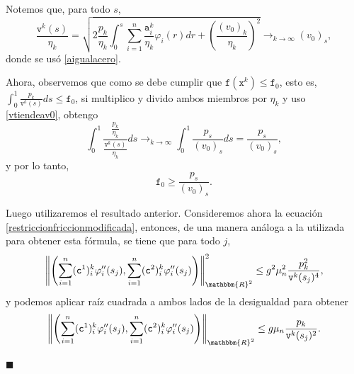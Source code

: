\documentclass[a4paper,10pt]{book}
\newcommand{\R}{\mathbbm{R}}
\newenvironment{dem}{\vspace*{-0.1cm}{\it Demostraci\'on:}}{\hfill
$\blacksquare$\\}
\begin{document}
\begin{dem}
Notemos que, para todo $s$,
\begin{equation}\label{vtiendeav0}
   \frac{\texttt{v}^k(s)}{\eta_k}=\sqrt{2\frac{p_k}{\eta_k}\int_0^s \sum_{i=1}^n\frac{\texttt{a}^k_i}{\eta_k}\varphi_i(r)dr +\left(\frac{(v_0)_k}{\eta_k}\right)^2} \mathop{\longrightarrow}_{k\to\infty}(v_0)_s, 
\end{equation}
donde se usó \eqref{aigualacero}.




Ahora, observemos que como se debe cumplir que $\texttt{f}(\texttt{x}^k)\leq \texttt{f}_0$, esto es, $\int_0^1\frac{p_k}{\texttt{v}^k(s)}ds\leq\texttt{f}_0$, si multiplico y divido ambos miembros por $\eta_k$ y uso \eqref{vtiendeav0}, obtengo $$\int_0^1\frac{\frac{p_k}{\eta_k}}{\frac{\texttt{v}^k(s)}{\eta_k}}ds\mathop{\longrightarrow}_{k\to\infty}\int_0^1\frac{p_s}{(v_0)_s} ds =\frac{p_s}{(v_0)_s},$$
y por lo tanto,
\begin{equation}\label{desigualdadf0v0}
    \texttt{f}_0\geq\frac{p_s}{(v_0)_s}.
\end{equation}

Luego utilizaremos el resultado anterior. Consideremos ahora la ecuación \eqref{restriccionfriccionmodificada}, entonces, de una manera análoga a la utilizada para obtener esta fórmula, se tiene que para todo $j$,
\begin{equation*}
    \left\| \left(\sum_{i=1}^n(\texttt{c}^{1})^k_i\varphi_i''(s_j), \sum_{i=1}^n(\texttt{c}^{2})^k_i\varphi_i''(s_j)\right) \right\|_{\R^2}^2\leq g^2\mu_n^2\frac{p_k^2}{\texttt{v}^k(s_j)^4},
\end{equation*}
y podemos aplicar raíz cuadrada a ambos lados de la desigualdad para obtener
\begin{equation}\label{desigualdadd2c}
    \left\| \left(\sum_{i=1}^n(\texttt{c}^{1})^k_i\varphi_i''(s_j), \sum_{i=1}^n(\texttt{c}^{2})^k_i\varphi_i''(s_j)\right) \right\|_{\R^2}\leq g\mu_n\frac{p_k}{\texttt{v}^k(s_j)^2}.
\end{equation}


\end{dem}
\end{document}
